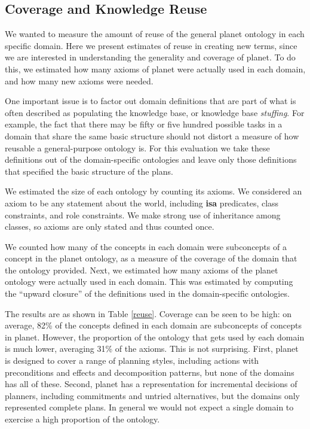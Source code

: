 \nopagebreak
\subsection{Coverage and Knowledge Reuse}

We wanted to measure the amount of reuse of 
the general {\sc planet} ontology in each specific domain.
Here we present estimates of reuse in creating new terms,
since we are interested in understanding the generality and coverage 
of {\sc planet}.
To do this, we estimated how many axioms of 
{\sc planet} were actually used in each domain,
and how many new axioms were needed.

One important issue is to factor out 
domain definitions that are part of what is often described as
populating the knowledge base, or knowledge base
{\em stuffing}.  For example, the fact that there may be fifty or
five hundred possible tasks in a domain that share the same 
basic structure should not distort a measure of how
reusable a general-purpose ontology is.
For this evaluation we take these definitions out of 
the domain-specific ontologies and 
leave only those definitions that specified the basic 
structure of the plans.

We estimated the size of each ontology by counting its
axioms.  We considered an axiom to be any statement about the world,
including {\bf isa} predicates, class constraints, and role constraints. 
We make strong use of inheritance among classes, so 
axioms are only stated and thus counted once.  

We counted how many of the concepts in each domain were subconcepts of 
a concept in the {\sc planet} ontology, as a measure of the coverage of the 
domain that the ontology provided.
Next, we estimated how many axioms of the {\sc planet} ontology were actually
used in each domain.  This was estimated by computing the ``upward
closure'' of the definitions used in the domain-specific ontologies.

The results are as shown in Table \ref{reuse}. Coverage can be seen to
be high: on average, 82\% 
of the concepts defined in each domain are subconcepts of concepts in
{\sc planet}. However, the proportion of the ontology that gets used by each
domain is much lower, averaging 31\% 
of the axioms. This is not surprising. First, {\sc planet} is designed
to cover a range of planning styles, including actions with
preconditions and effects and decomposition patterns, but none of the
domains has all of these. Second, {\sc planet} has a representation
for incremental decisions of planners, including commitments and untried
alternatives, but the domains only represented complete plans. In
general we would not expect a single domain to exercise a high
proportion of the ontology.

